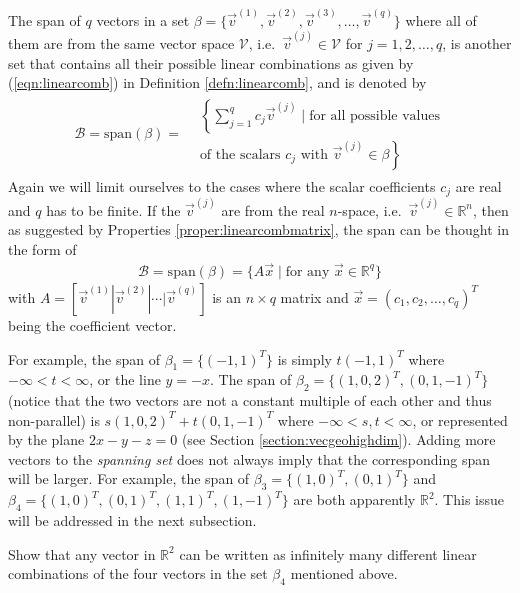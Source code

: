 \begin{defn}[Span]
\label{defn:span}
The span of $q$ vectors in a set $\mathcal{\beta} = \{\vec{v}^{(1)}, \vec{v}^{(2)}, \vec{v}^{(3)}, \ldots, \allowbreak \vec{v}^{(q)}\}$ where all of them are from the same vector space $\mathcal{V}$, i.e.\ $\vec{v}^{(j)} \in \mathcal{V}$ for $j = 1, 2, \ldots, q$, is another set that contains all their possible linear combinations as given by (\ref{eqn:linearcomb}) in Definition \ref{defn:linearcomb}, and is denoted by
\begin{align}
\mathcal{B} = \text{span}(\mathcal{\beta}) = \begin{aligned}
&\left\{\sum_{j=1}^{q} c_j\vec{v}^{(j)} \mid \text{for all possible values}\right. \\ 
&\left.\text{of the scalars $c_j$ with $\vec{v}^{(j)} \in \mathcal{\beta}$}\right\}
\end{aligned}
\end{align}
Again we will limit ourselves to the cases where the scalar coefficients $c_j$ are real and $q$ has to be finite. If the $\vec{v}^{(j)}$ are from the real $n$-space, i.e.\ $\vec{v}^{(j)} \in \mathbb{R}^n$, then as suggested by Properties \ref{proper:linearcombmatrix}, the span can be thought in the form of 
\begin{align}
\mathcal{B} = \text{span}(\mathcal{\beta}) = \{A\vec{x} \mid \text{for any } \vec{x} \in \mathbb{R}^q\}
\end{align}
with $A = [\vec{v}^{(1)}|\vec{v}^{(2)}|\cdots|\vec{v}^{(q)}]$ is an $n \times q$ matrix and
$\vec{x} = (c_1, c_2, \ldots, c_q)^T$ being the coefficient vector.
\end{defn}
For example, the span of $\mathcal{\beta}_1 = \{(-1,1)^T\}$ is simply $t(-1,1)^T$ where $-\infty < t < \infty$, or the line $y = -x$. The span of $\mathcal{\beta}_2 = \{(1,0,2)^T, (0,1,-1)^T\}$ (notice that the two vectors are not a constant multiple of each other and thus non-parallel) is $s(1,0,2)^T + t(0,1,-1)^T$ where $-\infty < s,t < \infty$, or represented by the plane $2x - y - z = 0$ (see Section \ref{section:vecgeohighdim}). Adding more vectors to the \textit{spanning set} does not always imply that the corresponding span will be larger. For example, the span of $\mathcal{\beta}_3 = \{(1,0)^T, (0,1)^T\}$ and $\mathcal{\beta}_4 = \{(1,0)^T, (0,1)^T, (1,1)^T, (1,-1)^T\}$ are both apparently $\mathbb{R}^2$. This issue will be addressed in the next subsection.
\begin{exmp}
\label{exmp:S3S4}
Show that any vector in $\mathbb{R}^2$ can be written as infinitely many different linear combinations of the four vectors in the set $\mathcal{\beta}_4$ mentioned above.
\end{exmp}
